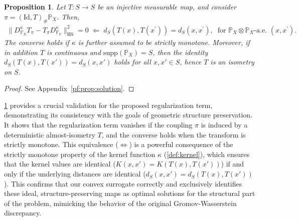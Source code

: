 \documentclass{article}
\newtheorem{proposition}{Proposition}
\begin{document}
\begin{proposition}
	\label{prop:solution}
	Let $T: S \to S$ be an injective measurable map, and consider $\pi = (\mathrm{Id},T)_{\#}\mathbb{P}_X$. Then,
	\begin{align*}
		\|D_{\mathbb{P}_X}^{\kappa}T_{\pi} - T_{\pi}D_{\mathbb{P}_Y}^{\kappa}\|_{\mathrm{HS}}^2 = 0 \;\Longleftarrow\;d_S(T(x),T(x^\prime)) = d_S(x,x^\prime) ,\;\; \text{for $\mathbb{P}_X \otimes \mathbb{P}_X$-a.e. $(x,x^\prime)$} .
	\end{align*}
	The converse holds if $\kappa$ is further assumed to be strictly monotone. Moreover, if in addition $T$ is continuous and $\mathrm{supp}(\mathbb{P}_X) = S$, then the identity $d_S(T(x),T(x'))=d_S(x,x')$ holds for all $x,x'\in S$, hence $T$ is an isometry on $S$.
\end{proposition}
\begin{proof}
	See Appendix~\ref{pf:prop:solution}.
\end{proof}
\cref{prop:solution} provides a crucial validation for the proposed regularization term, demonstrating its consistency with the goals of geometric structure preservation. It shows that the regularization term vanishes if the coupling $\pi$ is induced by a deterministic almost-isometry $T$, and the converse holds when the transform is strictly monotone. This equivalence ($\iff$) is a powerful consequence of the strictly monotone property of the kernel function $\kappa$ (\cref{def:kernel}), which ensures that the kernel values are identical ($K(x,x') = K(T(x),T(x'))$) if and only if the underlying distances are identical ($d_S(x,x') = d_S(T(x),T(x'))$). This confirms that our convex surrogate correctly and exclusively identifies these ideal, structure-preserving maps as optimal solutions for the structural part of the problem, mimicking the behavior of the original Gromov-Wasserstein discrepancy.
\end{document}
